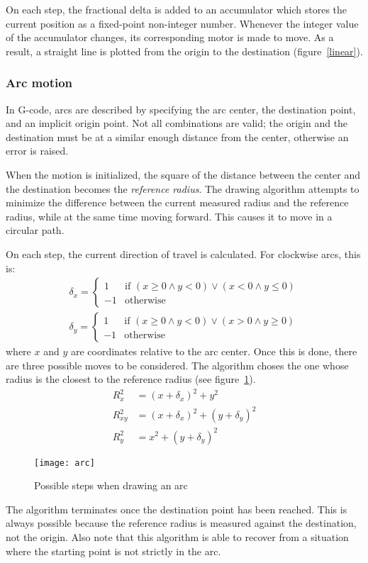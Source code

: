On each step, the fractional delta is added to an accumulator which stores the
current position as a fixed-point non-integer number. Whenever the integer value
of the accumulator changes, its corresponding motor is made to move. As a
result, a straight line is plotted from the origin to the destination
(figure~\ref{linear}).

\subsubsection{Arc motion}

In G-code, arcs are described by specifying the arc center, the destination
point, and an implicit origin point. Not all combinations are valid; the origin
and the destination must be at a similar enough distance from the center,
otherwise an error is raised.

When the motion is initialized, the square of the distance between the center
and the destination becomes the \textit{reference radius}. The drawing algorithm
attempts to minimize the difference between the current measured radius and the
reference radius, while at the same time moving forward. This causes it to move
in a circular path.

On each step, the current direction of travel is calculated. For clockwise arcs,
this is:
\begin{gather*}
    \delta_x = \begin{cases}
        1 & \text{if } (x \geq 0 \land y < 0) \lor (x < 0 \land y \leq 0)\\
        -1 & \text{otherwise}
    \end{cases}
    \\
    \delta_y = \begin{cases}
        1 & \text{if } (x \geq 0 \land y < 0) \lor (x > 0 \land y \geq 0)\\
        -1 & \text{otherwise}
    \end{cases}
\end{gather*}
where $x$ and $y$ are coordinates relative to the arc center. Once this is done,
there are three possible moves to be considered. The algorithm choses the one
whose radius is the closest to the reference radius (see figure~\ref{arc}).
\begin{align*}
    R^2_x &= (x + \delta_x)^2 + y^2 \\
    R^2_{xy} &= (x + \delta_x)^2 + (y + \delta_y)^2 \\
    R^2_y &= x^2 + (y + \delta_y)^2
\end{align*}

\begin{figure}[ht]
    \begin{center}
        \texttt{[image: arc]}
        \caption{Possible steps when drawing an arc}
        \label{arc}
    \end{center}
\end{figure}

The algorithm terminates once the destination point has been reached. This is
always possible because the reference radius is measured against the
destination, not the origin. Also note that this algorithm is able to recover
from a situation where the starting point is not strictly in the arc.
